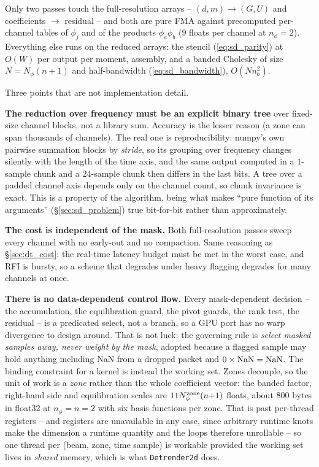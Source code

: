 \documentclass{article}
\numberwithin{equation}{section}   %
\begin{document}
Only two passes touch the full-resolution arrays -- $(d,m) \rightarrow (G,U)$ and coefficients $\rightarrow$
residual -- and both are pure FMA against precomputed per-channel tables of $\phi_j$ and of the products
$\phi_a\phi_b$ ($9$ floats per channel at $n_\phi = 2$).  Everything else runs on the reduced arrays: the
stencil (\ref{eq:sd_parity}) at $O(W)$ per output per moment, assembly, and a banded Cholesky of size
$N = N_\phi(n+1)$ and half-bandwidth (\ref{eq:sd_bandwidth}), $O(N n_b^2)$.

Three points that are not implementation detail.

{\bf The reduction over frequency must be an explicit binary tree} over fixed-size channel blocks, not a
library sum.  Accuracy is the lesser reason (a zone can span thousands of channels).  The real one is
reproducibility: numpy's own pairwise summation blocks by {\em stride}, so its grouping over frequency changes
silently with the length of the time axis, and the same output computed in a $1$-sample chunk and a $24$-sample
chunk then differs in the last bits.  A tree over a padded channel axis depends only on the channel count, so
chunk invariance is exact.  This is a property of the algorithm, being what makes ``pure function of its
arguments'' (\S\ref{sec:sd_problem}) true bit-for-bit rather than approximately.

{\bf The cost is independent of the mask.}  Both full-resolution passes sweep every channel with no early-out
and no compaction.  Same reasoning as \S\ref{sec:dt_cost}: the real-time latency budget must be met in the
worst case, and RFI is bursty, so a scheme that degrades under heavy flagging degrades for many channels at
once.

{\bf There is no data-dependent control flow.}  Every mask-dependent decision -- the accumulation, the
equilibration guard, the pivot guards, the rank test, the residual -- is a predicated select, not a branch, so
a GPU port has no warp divergence to design around.  That is not luck: the governing rule is {\em select masked
samples away, never weight by the mask}, adopted because a flagged sample may hold anything including NaN from
a dropped packet and $0 \times {\rm NaN} = {\rm NaN}$.  The binding constraint for a kernel is instead the
working set.  Zones decouple, so the unit of work is a {\em zone} rather than the whole coefficient vector: the
banded factor, right-hand side and equilibration scales are $11 N_\phi^{\rm zone}(n{+}1)$ floats, about $800$
bytes in float32 at $n_\phi = n = 2$ with six basis functions per zone.  That is past per-thread registers --
and registers are unavailable in any case, since arbitrary runtime knots make the dimension a runtime quantity
and the loops therefore unrollable -- so one thread per (beam, zone, time sample) is workable provided the
working set lives in {\em shared} memory, which is what \texttt{Detrender2d} does.
\end{document}
